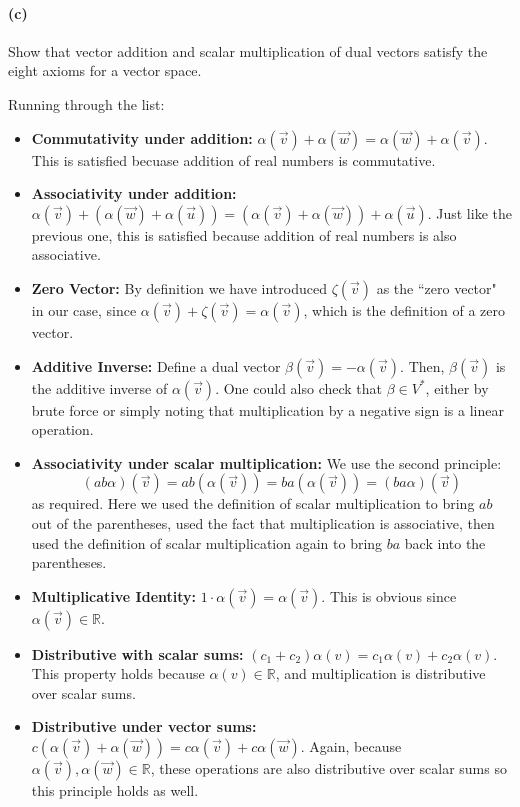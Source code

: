\documentclass{article}
\begin{document}
\paragraph{(c)}
Show that vector addition and scalar multiplication of dual vectors satisfy the eight axioms for a vector space.\\

\begin{solution}
    Running through the list:
    \begin{itemize}
        \item \textbf{Commutativity under addition:} $\alpha(\vec v) + \alpha(\vec w) = \alpha(\vec w) + \alpha(\vec v)$. This is satisfied becuase addition of real numbers is commutative.
        \item \textbf{Associativity under addition:} $\alpha(\vec v) + (\alpha(\vec w) + \alpha(\vec u)) = (\alpha(\vec v) + \alpha(\vec w)) + \alpha(\vec u)$. Just like the previous one, this is satisfied because addition of real numbers is also associative.
        \item \textbf{Zero Vector:} By definition we have introduced $\zeta(\vec v)$ as the ``zero vector" in our case, since $\alpha(\vec v) + \zeta(\vec v) = \alpha(\vec v)$, which is the definition of a zero vector.
        \item \textbf{Additive Inverse:} Define a dual vector $\beta(\vec v) = -\alpha(\vec v)$. Then, $\beta(\vec v)$ is the additive inverse of $\alpha(\vec v)$. One could also check that $\beta \in V^*$, either by brute force or simply noting that multiplication by a negative sign is a linear operation.
        \item \textbf{Associativity under scalar multiplication:} We use the second principle:
        \[ (ab\alpha)(\vec v) = ab(\alpha(\vec v)) = ba(\alpha(\vec v)) = (ba\alpha)(\vec v)\]
        as required. Here we used the definition of scalar multiplication to bring $ab$ out of the parentheses, used the fact that multiplication is associative, then used the definition of scalar multiplication again to bring $ba$ back into the parentheses.
        \item \textbf{Multiplicative Identity:} $1 \cdot \alpha(\vec v) = \alpha(\vec v)$. This is obvious since $\alpha(\vec v) \in \mathbb R$.
        \item \textbf{Distributive with scalar sums:} $(c_1 + c_2)\alpha(v) = c_1\alpha(v) + c_2\alpha(v)$. This property holds because $\alpha(v) \in \mathbb R$, and multiplication is distributive over scalar sums.
        \item \textbf{Distributive under vector sums:} $c(\alpha(\vec v) + \alpha(\vec w)) = c\alpha(\vec v) + c\alpha(\vec w)$. Again, because $\alpha(\vec v), \alpha(\vec w) \in \mathbb R$, these operations are also distributive over scalar sums so this principle holds as well.
    \end{itemize}
\end{solution}
\end{document}
